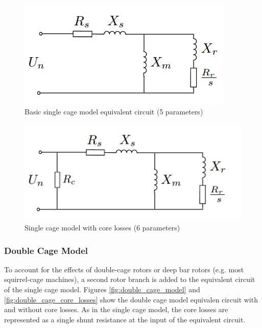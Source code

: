 \documentclass{article}
\begin{document}
\begin{figure}[htp]
\begin{center}
\includegraphics[scale=0.85]{./Figures/Single_cage_equiv_circuit.png}
\caption{Basic single cage model equivalent circuit (5 parameters)}
\label{fig:single_cage_model}
\end{center}
\end{figure}

\begin{figure}[htp]
\begin{center}
\includegraphics[scale=0.7]{./Figures/single_cage.png}
\caption{Single cage model with core losses (6 parameters)}
\label{fig:single_cage_core_losses}
\end{center}
\end{figure}

\subsubsection{Double Cage Model}

To account for the effects of double-cage rotors or deep bar rotors (e.g. most squirrel-cage machines), a second rotor branch is added to the equivalent circuit of the single cage model. Figures \ref{fig:double_cage_model} and \ref{fig:double_cage_core_losses} show the double cage model equivalen circuit with and without core losses. As in the single cage model, the core losses are represented as a single shunt resistance at the input of the equivalent circuit.
\end{document}
